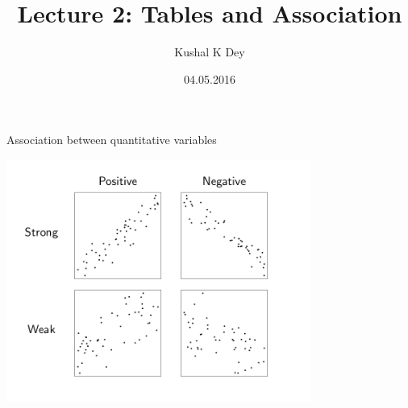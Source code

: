 \documentclass{beamer}\usepackage[]{graphicx}\usepackage[]{color}
\title{Lecture 2: Tables and Association}
\author{Kushal K Dey}
\date{04.05.2016}
\begin{document}





\begin{frame}{}
\maketitle
\end{frame}


\begin{frame}[fragile]{Association between quantitative variables}

\includegraphics[width=10cm,keepaspectratio]{P1.png}

\end{frame}
\end{document}
